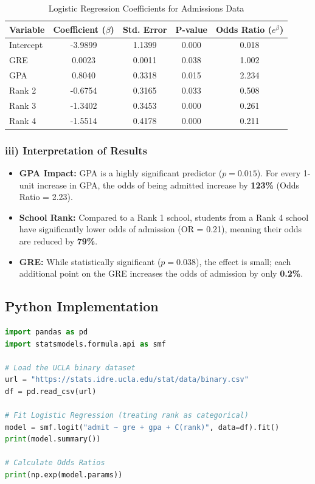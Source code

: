 \documentclass[12pt]{article}
\begin{document}
\begin{table}[h!]
\centering
\caption{Logistic Regression Coefficients for Admissions Data}
\begin{tabular}{@{}lcccc@{}}
\toprule
Variable & Coefficient ($\beta$) & Std. Error & P-value & Odds Ratio ($e^\beta$) \\ \midrule
Intercept & -3.9899 & 1.1399 & 0.000 & 0.018 \\
GRE & 0.0023 & 0.0011 & 0.038 & 1.002 \\
GPA & 0.8040 & 0.3318 & 0.015 & 2.234 \\
Rank 2 & -0.6754 & 0.3165 & 0.033 & 0.508 \\
Rank 3 & -1.3402 & 0.3453 & 0.000 & 0.261 \\
Rank 4 & -1.5514 & 0.4178 & 0.000 & 0.211 \\ \bottomrule
\end{tabular}
\end{table}

\subsubsection{iii) Interpretation of Results}
\begin{itemize}
    \item \textbf{GPA Impact:} GPA is a highly significant predictor ($p = 0.015$). For every 1-unit increase in GPA, the odds of being admitted increase by \textbf{123\%} (Odds Ratio = 2.23).
    \item \textbf{School Rank:} Compared to a Rank 1 school, students from a Rank 4 school have significantly lower odds of admission (OR = 0.21), meaning their odds are reduced by \textbf{79\%}.
    \item \textbf{GRE:} While statistically significant ($p = 0.038$), the effect is small; each additional point on the GRE increases the odds of admission by only \textbf{0.2\%}.
\end{itemize}

\subsection{Python Implementation}
\begin{lstlisting}[language=Python]
import pandas as pd
import statsmodels.formula.api as smf

# Load the UCLA binary dataset
url = "https://stats.idre.ucla.edu/stat/data/binary.csv"
df = pd.read_csv(url)

# Fit Logistic Regression (treating rank as categorical)
model = smf.logit("admit ~ gre + gpa + C(rank)", data=df).fit()
print(model.summary())

# Calculate Odds Ratios
print(np.exp(model.params))
\end{lstlisting}
\end{document}
